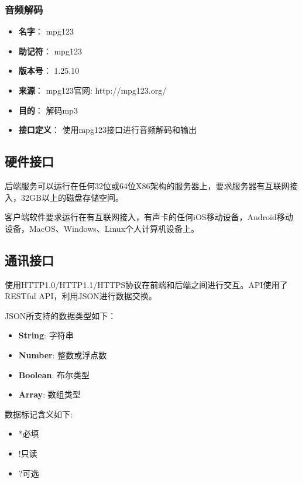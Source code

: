 \subsubsection{音频解码}
\begin{itemize}
	\item \textbf{名字}：
	mpg123
	\item \textbf{助记符}：
	mpg123
	\item \textbf{版本号}：
	1.25.10
	\item \textbf{来源}：
	mpg123官网: http://mpg123.org/
	\item \textbf{目的}：
	解码mp3
	\item \textbf{接口定义}：
	使用mpg123接口进行音频解码和输出
\end{itemize}

\subsection{硬件接口}

后端服务可以运行在任何32位或64位X86架构的服务器上，要求服务器有互联网接入，32GB以上的磁盘存储空间。

客户端软件要求运行在有互联网接入，有声卡的任何iOS移动设备，Android移动设备，MacOS、Windows、Linux个人计算机设备上。


\subsection{通讯接口}

使用HTTP1.0/HTTP1.1/HTTPS协议在前端和后端之间进行交互。API使用了RESTful API，利用JSON进行数据交换。

JSON所支持的数据类型如下：
\begin{itemize}
	\item \textbf{String}: 字符串
	\item \textbf{Number}: 整数或浮点数
	\item \textbf{Boolean}: 布尔类型
	\item \textbf{Array}: 数组类型
\end{itemize}

数据标记含义如下:
\begin{itemize}
	\item *必填
	\item !只读
	\item ?可选
\end{itemize}

